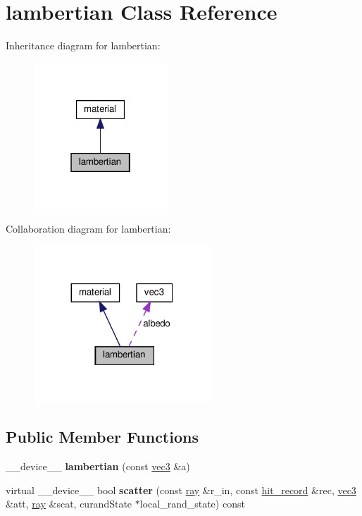 \hypertarget{classlambertian}{}\section{lambertian Class Reference}
\label{classlambertian}


Inheritance diagram for lambertian\+:
\nopagebreak
\begin{figure}[H]
\begin{center}
\leavevmode
\includegraphics[width=142pt]{classlambertian__inherit__graph}
\end{center}
\end{figure}


Collaboration diagram for lambertian\+:
\nopagebreak
\begin{figure}[H]
\begin{center}
\leavevmode
\includegraphics[width=188pt]{classlambertian__coll__graph}
\end{center}
\end{figure}
\subsection*{Public Member Functions}
\begin{DoxyCompactItemize}
\item 
\mbox{\label{classlambertian_a8cd4a4214f00f851d5d107c2222b1b1f}} 
\+\_\+\+\_\+device\+\_\+\+\_\+ {\bfseries lambertian} (const \hyperlink{classvec3}{vec3} \&a)
\item 
\mbox{\label{classlambertian_ab1d84962a8509336abe8f9287e55da07}} 
virtual \+\_\+\+\_\+device\+\_\+\+\_\+ bool {\bfseries scatter} (const \hyperlink{classray}{ray} \&r\+\_\+in, const \hyperlink{structhit__record}{hit\+\_\+record} \&rec, \hyperlink{classvec3}{vec3} \&att, \hyperlink{classray}{ray} \&scat, curand\+State $\ast$local\+\_\+rand\+\_\+state) const
\end{DoxyCompactItemize}
